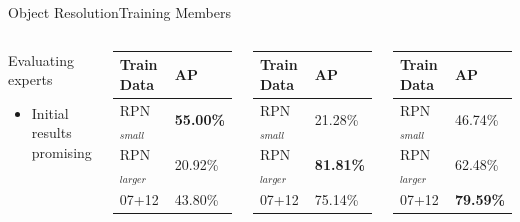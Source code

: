 \begin{frame}{Object Resolution}{Training Members}
\begin{columns}
      \begin{block}{Evaluating experts}
        \begin{itemize}
            \item Initial results promising
        \end{itemize}
    \end{block}
       

        
        \begin{table}[h]
        \centering
        \begin{tabular}{|l|l|}
        \hline
        \textbf{Train Data} & \textbf{AP}      \\ \hline
        RPN$_{small}$      & \textbf{55.00\%} \\ \hline
        RPN$_{larger}$      & 20.92\% \\ \hline
        07+12        & 43.80\% \\ \hline
        \end{tabular}
        \end{table}

        \begin{table}[h]
        \centering
        \begin{tabular}{|l|l|}
        \hline
        \textbf{Train Data} & \textbf{AP}      \\ \hline
        RPN$_{small}$      & 21.28\% \\ \hline
        RPN$_{larger}$      & \textbf{81.81\%} \\ \hline
        07+12        & 75.14\% \\ \hline
        \end{tabular}
        \end{table}


        \begin{table}[h]
        \centering
        \begin{tabular}{|l|l|}
        \hline
        \textbf{Train Data} & \textbf{AP}      \\ \hline
        RPN$_{small}$      & 46.74\% \\ \hline
        RPN$_{larger}$      & 62.48\% \\ \hline
        07+12        & \textbf{79.59\%} \\ \hline
        \end{tabular}
        \end{table}


      
    \end{columns}
\end{frame}

